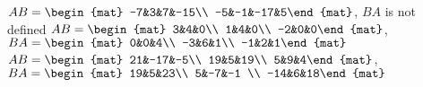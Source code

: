 \begin{Answer}
\Question $AB = \begin{mat} -7&3&7&-15\\  -5&-1&-17&5\end{mat}$, $BA$ is not defined
\Question $AB = \begin{mat} 3&4&0\\  1&4&0\\  -2&0&0\end{mat}$, $BA = \begin{mat} 0&0&4\\  -3&6&1\\  -1&2&1\end{mat}$
\Question $AB = \begin{mat} 21&-17&-5\\  19&5&19\\  5&9&4\end{mat}$, $BA = \begin{mat} 19&5&23\\  5&-7&-1
\\  -14&6&18\end{mat}$
\end{Answer}
